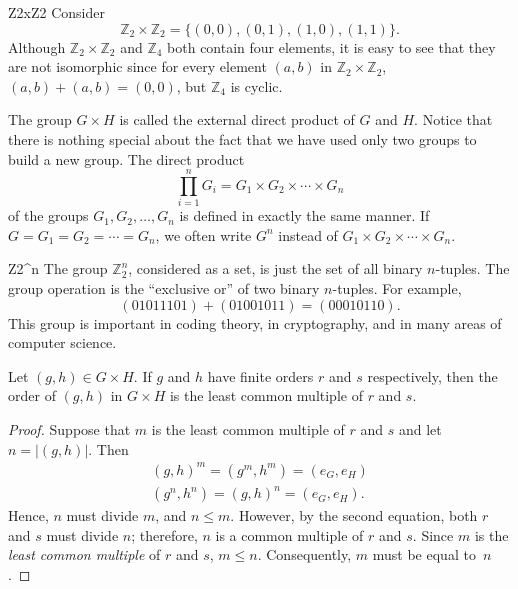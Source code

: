 \begin{example}{Z2xZ2}
Consider
\[
{\mathbb Z}_2 \times {\mathbb Z}_2 = \{ (0, 0), (0, 1), (1, 0),(1, 1) \}.
\]
Although ${\mathbb Z}_2 \times {\mathbb Z}_2$ and ${\mathbb Z}_4$ both contain four elements, it is easy to see that they are not isomorphic since for every element $(a,b)$ in ${\mathbb Z}_2 \times {\mathbb Z}_2$, $(a,b) + (a,b) = (0,0)$, but ${\mathbb Z}_4$ is cyclic.
\end{example}

The group $G \times H$ is called the {\bfi external direct product\/} of  $G$ and $H$. Notice that there is nothing special about the fact that we have used only two groups to build a new group. The direct product
\[
\prod_{i = 1}^n G_i = G_1 \times G_2 \times \cdots \times G_n
\]
of the groups $G_1, G_2, \ldots, G_n$ is defined in exactly the same manner. If $G = G_1 = G_2 = \cdots = G_n$, we often write $G^n$ instead of $G_1 \times G_2 \times \cdots \times G_n$.
 
\begin{example}{Z2^n}
The group ${\mathbb Z}_2^n$, considered as a set, is just the set of all
binary $n$-tuples. The group operation is the ``exclusive or'' of two
binary $n$-tuples. For example, 
\[
(01011101) + (01001011) = (00010110).
\]
This group is important in coding theory, in cryptography, and in many
areas of computer science.  
\end{example}

 
\begin{theorem}\label{isomorph:lcm_theorem}
Let $(g, h) \in G \times H$. If $g$ and $h$ have finite orders $r$ and
$s$ respectively, then the order of $(g, h)$ in $G \times H$ is the
least common multiple of $r$ and $s$. 
\end{theorem}

 
\begin{proof}
Suppose that $m$ is the least common multiple of $r$ and $s$ and let
$n = |(g,h)|$. Then 
\begin{gather*}
(g,h)^m  = (g^m, h^m) = (e_G,e_H) \\
(g^n, h^n)  = (g, h)^n = (e_G,e_H).
\end{gather*}
Hence, $n$ must divide $m$, and $n \leq m$.  However, by the second
equation, both $r$ and $s$ must divide $n$; therefore, $n$ is a common
multiple of $r$ and $s$. Since $m$ is the {\em least common multiple\/}
of $r$ and $s$, $m \leq n$.  Consequently, $m$ must be equal to~$n$.
\end{proof}
 

